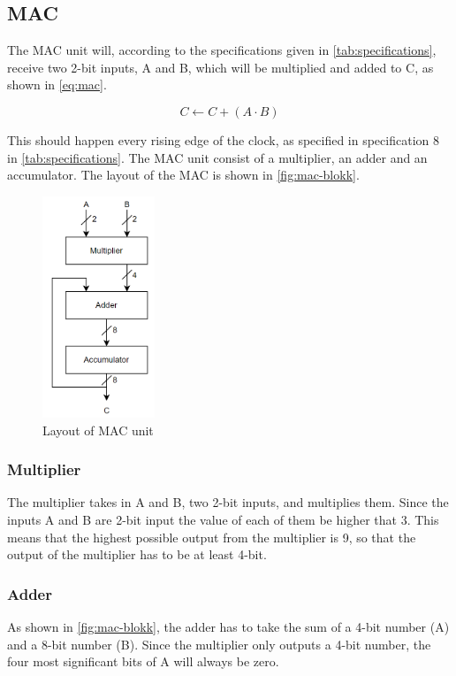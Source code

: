 \subsection{MAC}
\label{subsec:MAC_theory}

The MAC unit will, according to the specifications given in \autoref{tab:specifications}, receive two 2-bit inputs, A and B, which will be multiplied and added to C, as shown in \autoref{eq:mac}. 

\begin{equation}
    \label{eq:mac}
    C \leftarrow C + (A \cdot B)
\end{equation}

 This should happen every rising edge of the clock, as specified in specification 8 in \autoref{tab:specifications}. The MAC unit consist of a multiplier, an adder and an accumulator. The layout of the MAC is shown in \autoref{fig:mac-blokk}. 

\begin{figure}[htpb]
    \centering
    \includegraphics[width=0.3\textwidth]{Figures/mac-blokk.png}
    \caption{Layout of MAC unit}
    \label{fig:mac-blokk}
\end{figure}


\subsubsection{Multiplier}
The multiplier takes in A and B, two 2-bit inputs, and multiplies them. Since the inputs A and B are 2-bit input the value of each of them be higher that 3. This means that the highest possible output from the multiplier is 9, so that the output of the multiplier has to be at least 4-bit. 

\subsubsection{Adder}
As shown in \autoref{fig:mac-blokk}, the adder has to take the sum of a 4-bit number (A) and a 8-bit number (B). Since the multiplier only outputs a 4-bit number, the four most significant bits of A will always be zero. 

